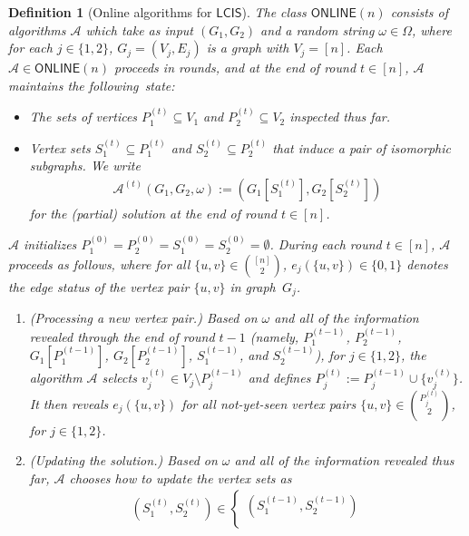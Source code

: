 \documentclass[11pt]{article}
\theoremstyle{plain}
\newtheorem{definition}{Definition}
\theoremstyle{definition}
\theoremstyle{remark}
\newcommand{\MCS}{\mathsf{LCIS}}
\newcommand{\bits}{\{0,1\}}
\newcommand{\Alg}{\mathcal{A}}
\newcommand{\online}{\mathsf{ONLINE}}
\begin{document}
\begin{definition}[Online algorithms for $\MCS$]\label{def:online}
    The class $\online(n)$ consists of algorithms $\Alg$ which take as input $(G_1, G_2)$ and a random string $\omega \in \Omega$, where for each $j \in \{1, 2\}$, $G_j = (V_j, E_j)$ is a graph with $V_j = [n]$. Each $\Alg \in \online(n)$ proceeds in rounds, and at the end of round $t \in [n]$, $\Alg$ maintains the following~state:
    \begin{itemize}
        \item The sets of vertices $P^{(t)}_1 \subseteq V_1$ and $P^{(t)}_2 \subseteq V_2$ inspected thus far.
        \item Vertex sets $S^{(t)}_1 \subseteq P^{(t)}_1$ and $S^{(t)}_2 \subseteq P^{(t)}_2$ that induce a pair of isomorphic subgraphs. We write
        \begin{align}
            \mathcal{A}^{(t)}(G_{1}, G_{2}, \omega) := \left(G_1\left[S^{(t)}_1\right], G_2\left[S^{(t)}_2\right]\right)
        \end{align}
        for the (partial) solution at the end of round $t \in [n]$. 
    \end{itemize}
    $\Alg$ initializes $P^{(0)}_1 = P^{(0)}_2 = S^{(0)}_1 = S^{(0)}_2 = \emptyset$. During each round $t \in [n]$, $\Alg$ proceeds as follows, where for all $\{u, v\} \in \binom{[n]}{2}$, $e_j(\{u, v\}) \in \bits$ denotes the edge status of the vertex pair $\{u, v\}$ in graph~$G_j$.
    \begin{enumerate}
        \item \emph{(Processing a new vertex pair.)} 
        Based on $\omega$ and all of the information revealed through the end of round $t-1$ 
        (namely, $P_{1}^{(t-1)}$, $P_{2}^{(t-1)}$, $G_{1}\left[ P_{1}^{(t-1)} \right]$, $G_{2}\left[ P_{2}^{(t-1)} \right]$, $S_{1}^{(t-1)}$, and $S_{2}^{(t-1)}$), 
        for $j \in \{1, 2\}$, 
        the algorithm $\Alg$ selects $v^{(t)}_j \in V_j \setminus P^{(t-1)}_j$ and defines $P^{(t)}_j := P^{(t-1)}_j \cup \{v^{(t)}_j\}$. It then reveals $e_j(\{u, v\})$ for all not-yet-seen vertex pairs $\{u, v\} \in \binom{P^{(t)}_{j}}{2}$, for $j \in \{1,2\}$.
        \item \emph{(Updating the solution.)} 
        Based on $\omega$ and all of the information revealed thus far, $\Alg$ chooses how to update the vertex sets as
        \begin{align}
            \left(S^{(t)}_1, S^{(t)}_2\right) \in \begin{cases}
                \left(S^{(t-1)}_1, S^{(t-1)}_2\right) \\

\end{cases}
\end{align}
\end{enumerate}
\end{definition}
\end{document}
